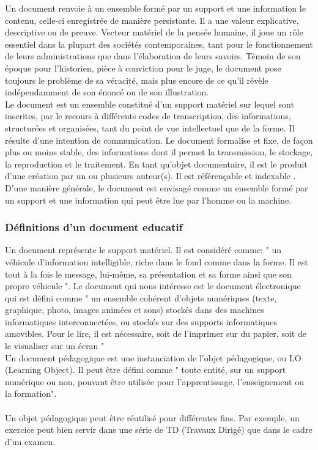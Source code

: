 \documentclass[12pt]{report}
\begin{document}
Un document renvoie à un ensemble formé par un support et une information le contenu, celle-ci enregistrée de manière persistante. Il a une valeur explicative, descriptive ou de preuve. Vecteur matériel de la pensée humaine, il joue un rôle essentiel dans la plupart des sociétés contemporaines, tant pour le fonctionnement de leurs administrations que dans l'élaboration de leurs savoirs. Témoin de son époque pour l'historien, pièce à conviction pour le juge, le document pose toujours le problème de sa véracité, mais plus encore de ce qu'il révèle indépendamment de son énoncé ou de son illustration\cite{2}.\\

Le document est un ensemble constitué d'un support matériel sur lequel sont inscrites, par le recours à  différents codes de transcription, des informations, structurées et organisées, tant du point de vue intellectuel que de la forme. Il résulte d'une intention de communication. Le document formalise et fixe, de façon plus ou moins stable, des informations dont il permet la transmission, le stockage, la reproduction et le traitement. En tant qu'objet documentaire, il est le produit d'une création par un ou plusieurs auteur(s). Il est référençable et indexable \cite{3}.\\

D’une manière générale, le document est envisagé comme un ensemble formé par un support et une information qui peut être lue par l’homme ou la machine.

\subsubsection{Définitions d'un document educatif}

Un document représente le support matériel. Il est considéré comme: " un véhicule d'information intelligible, riche dans le fond comme dans la forme. Il est tout à la fois le message, lui-même, sa présentation et sa forme ainsi que son propre véhicule ". Le document qui nous intéresse est le document électronique qui est défini comme " un ensemble cohérent d'objets numériques (texte, graphique, photo, images animées et sons) stockés dans des machines informatiques interconnectées, ou stockés sur des supports informatiques amovibles. Pour le lire, il est nécessaire, soit de l'imprimer sur du papier, soit de le visualiser sur un écran " \\
Un document pédagogique est une instanciation de l'objet pédagogique, ou LO (Learning Object). Il peut être défini comme " toute entité, sur un support numérique ou non, pouvant être utilisée pour l'apprentissage, l'enseignement ou la formation".\\
\\Un objet pédagogique peut être réutilisé pour différentes fins. Par exemple, un exercice peut bien servir dans une série de TD (Travaux Dirigé) que dans le cadre d'un examen\cite{4}.
\\
\end{document}
